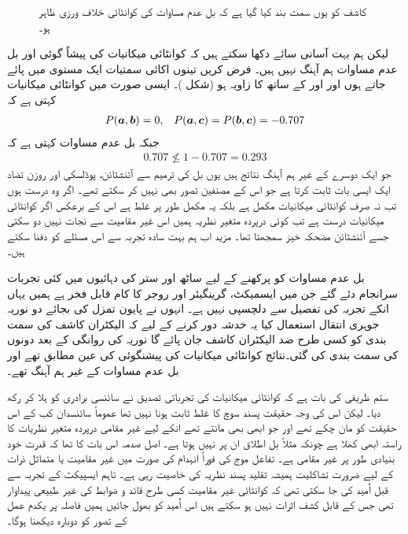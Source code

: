 \begin{figure}
\centering
{}
\caption{کاشف کو یوں سمت بند کیا گیا ہے کہ بل عدم مساوات کی کوانٹائی   خلاف ورزی   ظاہر ہو۔}
\label{شکل_بکھراو_بل_عدم_مساوات}
\end{figure}

لیکن ہم بہت آسانی سائے دکھا سکتے ہیں کہ کوانٹائی میکانیات کی پیشاً گوئی  اور بل عدم مساوات ہم آہنگ نہیں ہیں۔ فرض کریں تینوں اکائی سمتیات ایک مستوی میں پائے جاتے ہوں اور  اور  کے ساتھ  کا زاویہ  ہو (شکل )۔ ایسی صورت میں کوانٹائی میکانیات کہتی ہے کہ 
\begin{align*}
	P({{\boldsymbol{a}}}, {{\boldsymbol{b}}}) = 0, && P({{\boldsymbol{a}}}, {{\boldsymbol{c}}}) = P({{\boldsymbol{b}}}, {{\boldsymbol{c}}}) = -\num{0.707}
\end{align*}
جبکہ بل عدم مساوات کہتی ہے کہ
\begin{align*}
	\num{0.707}\nleq1-\num{0.707} = \num{0.293}
\end{align*}
جو ایک دوسرے کے غیر ہم آہنگ نتائج ہیں یوں بل کی ترمیم سے آئنشٹائن، پوڈلسکی اور روزن تضاد ایک ایسی بات ثابت  کرتا ہے جو اس کے مصنفین تصور بھی نہیں کر سکتے تھے۔ اگر وہ درست ہوں تب نہ صرف کوانٹائی  میکانیات مکمل ہے بلکہ یہ مکمل طور پر غلط ہے اس کے برعکس اگر کوانٹائی میکانیات  درست ہے تب کوئی درپردہ متغیر نظریہ ہمیں اس غیر مقامیت سے نجات نہیں دو سکتی جسے آئنشٹائن مضحکہ خیز سمجھتا تھا۔	 مزید اب ہم بہت سادہ  تجربہ سے اس مسئلے کو دفنا سکتے ہیں۔

بل عدم مساوات کو پرکھنے کے لیے ساٹھ اور ستر کی دہائیوں میں کئی تجربات سرانجام دئے گئے جن میں ایسمیکٹ، گرینگیئر اور روجر کا کام قابل فخر ہے ہمیں یہاں انکے تجربہ کی تفصیل سے دلچسپی نہیں ہے۔ انہوں نے پایون تمزل کی بجائے دو نوریہ جوہری انتقال استعمال کیا یہ خدشہ دور کرنے کے لیے کہ الیکٹران کاشف کی سمت بندی کو کسی طرح ضد الیکٹران کاشف جان پائے گا  نوریہ کی روانگی کے بعد دونوں کی سمت بندی کی گئی۔نتائج کوانٹائی میکانیات کی پیشنگوئی  کی عین مطابق تھے اور بل عدم مساوات کے غیر ہم آہنگ تھے۔

ستم ظریفی کی بات ہے کہ کوانٹائی میکانیات کی تجرباتی تصدیق نے سائنسی برادری کو ہلا کر رکھ دیا۔ لیکن اس کی وجہ حقیقت پسند سوچ کا غلط ثابت ہونا نہیں تھا عموماً سائنسدان کب کے اس حقیقت کو مان چکے تھے اور جو ابھی بھی مانتے تھے انکے لیے غیر مقامی درپردہ متغیر نظریات کا راستہ ابھی کھلا ہے چونکہ مثلاً بل اطلاق ان پر نہیں ہوتا ہے۔ اصل صدمہ  اس بات کا تھا کہ قدرت خود بنیادی طور پر غیر مقامی ہے۔ تفاعل موج کی فوراً انہدام کی صورت میں غیر مقامیت یا متماثل ذرات کے لیے ضرورت تشاکلیت ہمیشہ تقلید پسند نظریہ کی خاصیت رہی ہے۔ تاہم ایسپیکٹ کے تجربہ سے قبل اُمید کی جا سکتی تھی کہ کوانٹائی غیر مقامیت کسی طرح قائد و ضوابط کی غیر طبیعی پیداوار تھی جس کے قابل کشف اثرات نہیں ہو سکتے ہیں اس اُمید کو بھول جائیں ہمیں فاصلہ پر یکدم عمل کے تصور کو دوبارہ دیکھنا ہوگا۔

